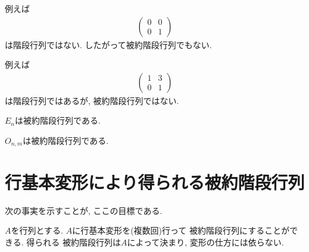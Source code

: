 \begin{example}
例えば
  \begin{align*}
    \begin{pmatrix}
      0&0\\0&1
    \end{pmatrix}
  \end{align*}
  は階段行列ではない.
  したがって被約階段行列でもない.

例えば
  \begin{align*}
    \begin{pmatrix}
      1&3\\0&1
    \end{pmatrix}
  \end{align*}
  は階段行列ではあるが,
  被約階段行列ではない.
\end{example}

\begin{example}
  $E_n$は被約階段行列である.
\end{example}

\begin{example}
  $O_{n,m}$は被約階段行列である.
\end{example}


\section{行基本変形により得られる被約階段行列}
次の事実を示すことが,
ここの目標である.
\begin{theorem}
  \label{thm:unique:reducedecheron}
  $A$を行列とする.
  $A$に行基本変形を(複数回)行って
  被約階段行列にすることができる.
  得られる
  被約階段行列は$A$によって決まり,
  変形の仕方には依らない.
\end{theorem}

